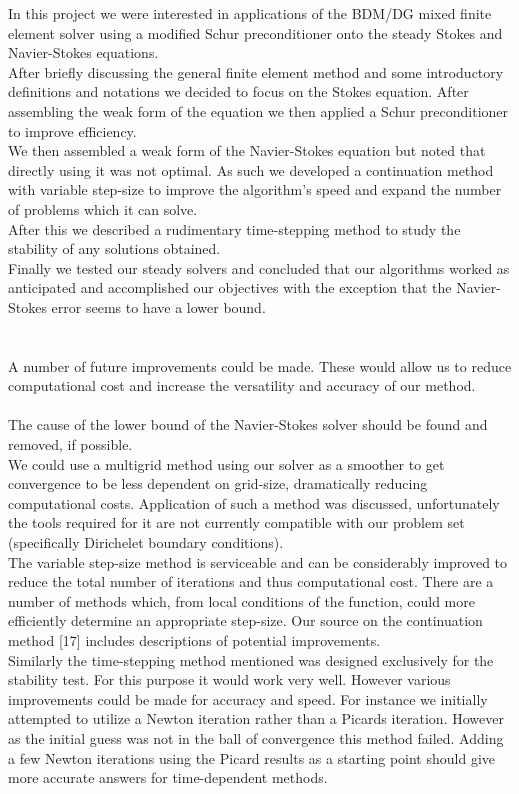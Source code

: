 \documentclass[11pt,twoside,a4paper]{article}
\begin{document}
In this project we were interested in applications of the BDM/DG mixed finite element solver using a modified Schur preconditioner onto the steady Stokes and Navier-Stokes equations.\\
After briefly discussing the general finite element method and some introductory definitions and notations we decided to focus on the Stokes equation. After assembling the weak form of the equation we then applied a Schur preconditioner to improve efficiency.\\
We then assembled a weak form of the Navier-Stokes equation but noted that directly using it was not optimal. As such we developed a continuation method with variable step-size to improve the algorithm's speed and expand the number of problems which it can solve.\\
After this we described a rudimentary time-stepping method to study the stability of any solutions obtained.\\
Finally we tested our steady solvers and concluded that our algorithms worked as anticipated and accomplished our objectives with the exception that the Navier-Stokes error seems to have a lower bound.\\
\\
\\
A number of future improvements could be made.
These would allow us to reduce computational cost and increase the versatility and accuracy of our method.\\
\\
The cause of the lower bound of the Navier-Stokes solver should be found and removed, if possible.\\
We could use a multigrid method using our solver as a smoother to get convergence to be less dependent on grid-size, dramatically reducing computational costs. Application of such a method was discussed, unfortunately the tools required for it are not currently compatible with our problem set (specifically Dirichelet boundary conditions).\\
The variable step-size method is serviceable and can be considerably improved to reduce the total number of iterations and thus computational cost. There are a number of methods which, from local conditions of the function, could more efficiently determine an appropriate step-size. Our source on the continuation method [17] includes descriptions of potential improvements.\\
Similarly the time-stepping method mentioned was designed exclusively for the stability test. For this purpose it would work very well. However various improvements could be made for accuracy and speed. For instance we initially attempted to utilize a Newton iteration rather than a Picards iteration. However as the initial guess was not in the ball of convergence this method failed. Adding a few Newton iterations using the Picard results as a starting point should give more accurate answers for time-dependent methods.\\
\end{document}
